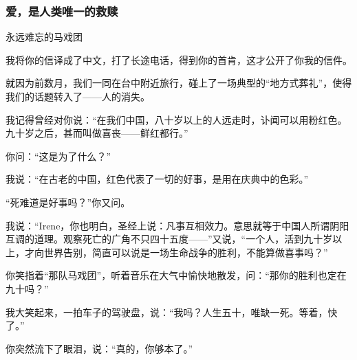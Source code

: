 \subsubsection{爱，是人类唯一的救赎}

\begin{center}
    \par 永远难忘的马戏团 
\end{center}
\par {}
\par 我将你的信译成了中文，打了长途电话，得到你的首肯，这才公开了你我的信件。
\par 就因为前数月，我们一同在台中附近旅行，碰上了一场典型的“地方式葬礼”，使得我们的话题转入了——人的消失。
\par 我记得曾经对你说：“在我们中国，八十岁以上的人远走时，讣闻可以用粉红色。九十岁之后，甚而叫做喜丧——鲜红都行。”
\par 你问：“这是为了什么？”
\par 我说：“在古老的中国，红色代表了一切的好事，是用在庆典中的色彩。”
\par “死难道是好事吗？”你又问。
\par 我说：“Irene，你也明白，圣经上说：凡事互相效力。意思就等于中国人所谓阴阳互调的道理。观察死亡的广角不只四十五度——”又说，“一个人，活到九十岁以上，才向世界告别，简直可以说是一场生命战争的胜利，不能算做喜事吗？”
\par 你笑指着“那队马戏团”，听着音乐在大气中愉快地散发，问：“那你的胜利也定在九十吗？”
\par 我大笑起来，一拍车子的驾驶盘，说：“我吗？人生五十，唯缺一死。等着，快了。”
\par 你突然流下了眼泪，说：“真的，你够本了。”
